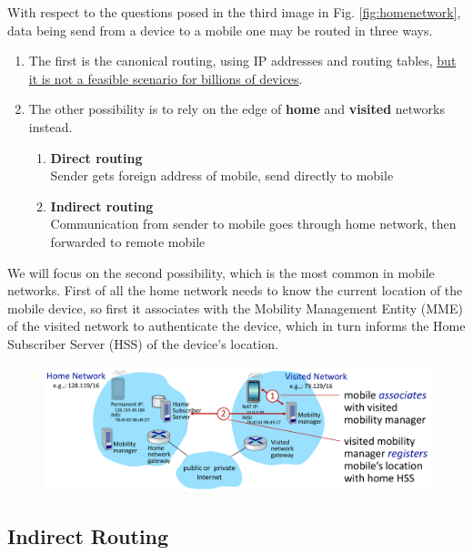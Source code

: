 With respect to the questions posed in the third image in Fig. \ref{fig:homenetwork}, data being send from a device to a mobile one may be routed in three ways.
\begin{enumerate}
   \item 
   The first is the canonical routing, using IP addresses and routing tables, \ul{but it is not a feasible scenario for billions of devices}.
   \item The other possibility is to rely on the edge of \textbf{home} and \textbf{visited} networks instead.
   \begin{enumerate}
      \item \textbf{Direct routing}\\
      Sender gets foreign address of mobile, send directly to mobile
      \item \textbf{Indirect routing}\\
      Communication from sender to mobile goes through home network, then forwarded to remote mobile
   \end{enumerate}
\end{enumerate}

We will focus on the second possibility, which is the most common in mobile networks.
First of all the home network needs to know the current location of the mobile device,
so first it associates with the Mobility Management Entity (MME) of the visited network to authenticate the device, which in turn informs the Home Subscriber Server (HSS) of the device's location.
\begin{figure}[htbp]
   \centering
   \includegraphics{images/mobility_homenetwork.png}
   \label{fig:mobility_homenetwork}
\end{figure}

\subsection{Indirect Routing}

